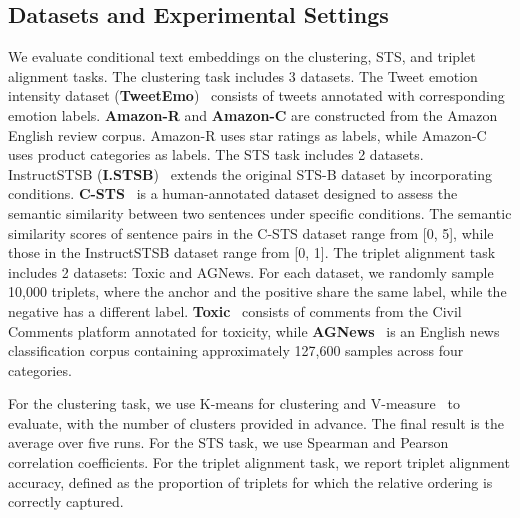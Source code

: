 \documentclass[11pt]{article}
\begin{document}
\subsection{Datasets and Experimental Settings}
We evaluate conditional text embeddings on the clustering, STS, and triplet alignment tasks.
The clustering task includes 3 datasets.
The Tweet emotion intensity dataset (\textbf{TweetEmo})~\cite{TweetEmo} consists of tweets annotated with corresponding emotion labels.
\textbf{Amazon-R} and \textbf{Amazon-C} are constructed from the Amazon English review corpus.
Amazon-R uses star ratings as labels, while Amazon-C uses product categories as labels.
The STS task includes 2 datasets.
InstructSTSB (\textbf{I.STSB})~\cite{InBedder} extends the original STS-B dataset by incorporating conditions.
\textbf{C-STS}~\cite{csts} is a human-annotated dataset designed to assess the semantic similarity between two sentences under specific conditions.
The semantic similarity scores of sentence pairs in the C-STS dataset range from [0, 5], while those in the InstructSTSB dataset range from [0, 1].
The triplet alignment task includes 2 datasets: Toxic and AGNews.
For each dataset, we randomly sample 10,000 triplets, where the anchor and the positive share the same label, while the negative has a different label.
\textbf{Toxic}~\cite{toxic} consists of comments from the Civil Comments platform annotated for toxicity, while \textbf{AGNews}~\cite{AGNews} is an English news classification corpus containing approximately 127,600 samples across four categories.








For the clustering task, we use K-means for clustering and V-measure~\cite{V-Measure} to evaluate, with the number of clusters provided in advance. 
The final result is the average over five runs.
For the STS task, we use Spearman and Pearson correlation coefficients.
For the triplet alignment task, we report triplet alignment accuracy, defined as the proportion of triplets for which the relative ordering is correctly captured.
\end{document}
